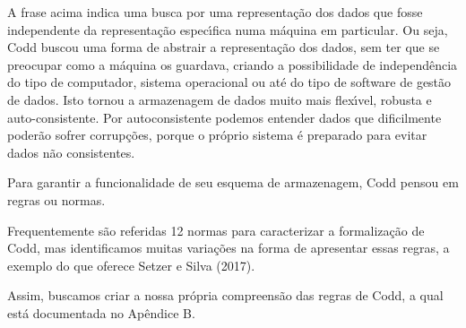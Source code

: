 \documentclass[
12pt,		%
openright,	%
twoside,  %
a4paper,			%
chapter=TITLE,		%
english,			%
french,				%
spanish,			%
brazil				%
]{USPSC-classe/USPSC}
\begin{document}
\noindent\begin{center}\mbox{\centering{}}\end{center}


A frase acima indica uma busca por uma representa\c{c}\~ao dos dados que fosse independente da representa\c{c}\~ao espec\'{\i}fica numa m\'aquina em particular. Ou seja, Codd buscou uma forma de abstrair a representa\c{c}\~ao dos dados, sem ter que se preocupar como a m\'aquina os guardava, criando a possibilidade de independ\^encia do tipo de computador, sistema operacional ou at\'e do tipo de software de gest\~ao de dados. Isto tornou a armazenagem de dados muito mais flex\'{\i}vel, robusta e auto-consistente. Por autoconsistente podemos entender dados que dificilmente poder\~ao sofrer corrup\c{c}\~oes, porque o pr\'oprio sistema \'e preparado para evitar dados n\~ao consistentes.








Para garantir a funcionalidade de seu esquema de armazenagem, Codd pensou em \textquotedbl  regras \textquotedbl  ou normas.








Frequentemente s\~ao referidas 12 normas para caracterizar a formaliza\c{c}\~ao de Codd, mas identificamos muitas varia\c{c}\~oes na forma de apresentar essas regras, a exemplo do que oferece Setzer e Silva (2017).








Assim, buscamos criar a nossa pr\'opria compreens\~ao das regras de Codd, a qual est\'a documentada no Ap\^endice B.
\end{document}
